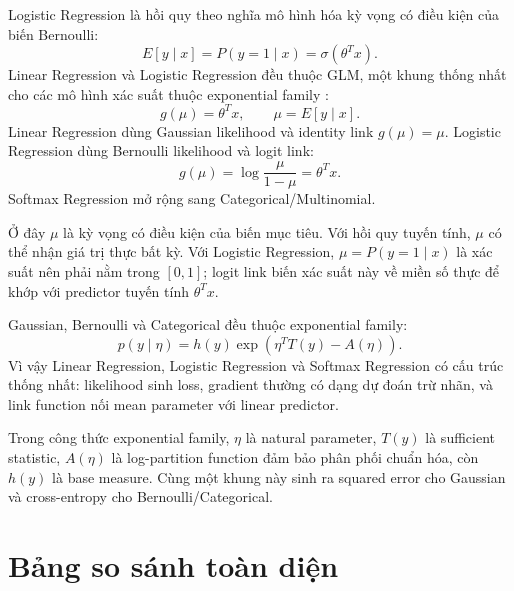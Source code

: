 \documentclass[12pt,a4paper]{article}
\begin{document}
Logistic Regression là hồi quy theo nghĩa mô hình hóa kỳ vọng có điều kiện của biến Bernoulli:
\begin{equation}
 E[y\mid x]=P(y=1\mid x)=\sigma(\theta^Tx).
\end{equation}
Linear Regression và Logistic Regression đều thuộc GLM, một khung thống nhất cho các mô hình xác suất thuộc exponential family \cite{murphy2012}:
\begin{equation}
 g(\mu)=\theta^Tx, \qquad \mu=E[y\mid x].
\end{equation}
Linear Regression dùng Gaussian likelihood và identity link $g(\mu)=\mu$. Logistic Regression dùng Bernoulli likelihood và logit link:
\begin{equation}
 g(\mu)=\log\frac{\mu}{1-\mu}=\theta^Tx.
\end{equation}
Softmax Regression mở rộng sang Categorical/Multinomial.

Ở đây $\mu$ là kỳ vọng có điều kiện của biến mục tiêu. Với hồi quy tuyến tính, $\mu$ có thể nhận giá trị thực bất kỳ. Với Logistic Regression, $\mu=P(y=1\mid x)$ là xác suất nên phải nằm trong $[0,1]$; logit link biến xác suất này về miền số thực để khớp với predictor tuyến tính $\theta^Tx$.

Gaussian, Bernoulli và Categorical đều thuộc exponential family:
\begin{equation}
 p(y\mid\eta)=h(y)\exp\left(\eta^TT(y)-A(\eta)\right).
\end{equation}
Vì vậy Linear Regression, Logistic Regression và Softmax Regression có cấu trúc thống nhất: likelihood sinh loss, gradient thường có dạng dự đoán trừ nhãn, và link function nối mean parameter với linear predictor.

Trong công thức exponential family, $\eta$ là natural parameter, $T(y)$ là sufficient statistic, $A(\eta)$ là log-partition function đảm bảo phân phối chuẩn hóa, còn $h(y)$ là base measure. Cùng một khung này sinh ra squared error cho Gaussian và cross-entropy cho Bernoulli/Categorical.

\section{Bảng so sánh toàn diện}
\end{document}

